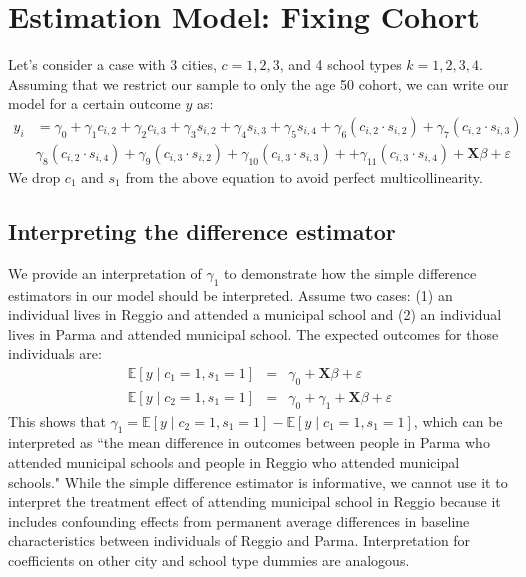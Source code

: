 \documentclass[11pt]{article}
\begin{document}
\section{Estimation Model: Fixing Cohort}

Let's consider a case with 3 cities, $c = 1, 2, 3$, and 4 school types $k = 1,2,3,4$. Assuming that we restrict our sample to only the age 50 cohort, we can write our model for a certain outcome $y$ as:
\begin{eqnarray}  \label{eq:specific2}
y_i & = \gamma_0 + \gamma_1 c_{i,2} + \gamma_2 c_{i,3} + \gamma_3 s_{i,2} + \gamma_4 s_{i,3} + \gamma_5 s_{i,4}  + \gamma_6 ({c_{i,2}}\cdot{s_{i,2}}) + \gamma_7 ({c_{i,2}}\cdot{s_{i,3}})  \nonumber \\
 & \gamma_8 ({c_{i,2}}\cdot{s_{i,4}}) + \gamma_9 ({c_{i,3}}\cdot{s_{i,2}}) + \gamma_{10} ({c_{i,3}}\cdot{s_{i,3}}) +  + \gamma_{11} ({c_{i,3}}\cdot{s_{i,4}}) + \mathbf{X}\beta + \varepsilon  
\end{eqnarray}
We drop $c_1$ and $s_1$ from the above equation to avoid perfect multicollinearity.

\subsection{Interpreting the difference estimator}

We provide an interpretation of $\gamma_1$ to demonstrate how the simple difference estimators in our model should be interpreted. Assume two cases: (1) an individual lives in Reggio and attended a municipal school and (2) an individual lives in Parma and attended municipal school. The expected outcomes for those individuals are:
\begin{eqnarray*}  
    \mathbb{E}[y \mid c_1 = 1, s_1 = 1] & = & \gamma_0 + \mathbf{X}\beta + \varepsilon \\
    \mathbb{E}[y \mid c_2 = 1, s_1 = 1] & = & \gamma_0 + \gamma_1 + \mathbf{X}\beta + \varepsilon      
\end{eqnarray*}
This shows that $\gamma_1 = \mathbb{E}[y \mid c_2 = 1, s_1 = 1] - \mathbb{E}[y \mid c_1 = 1, s_1 = 1]$, which can be interpreted as ``the mean difference in outcomes between people in Parma who attended municipal schools and people in Reggio who attended municipal schools." While the simple difference estimator is informative, we cannot use it to interpret the treatment effect of attending municipal school in Reggio because it includes confounding effects from permanent average differences in baseline characteristics between individuals of Reggio and Parma. Interpretation for coefficients on other city and school type dummies are analogous.
\end{document}
